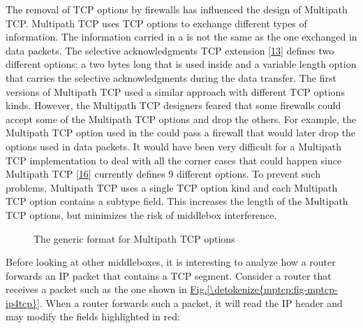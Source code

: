 \documentclass[letterpaper,10pt,english]{sphinxmanual}
\begin{document}
\sphinxAtStartPar
The removal of TCP options by firewalls has influenced the design of Multipath TCP. Multipath TCP uses TCP options to exchange different types of information. The information carried in a  is not the same as the one exchanged in data packets. The selective acknowledgments TCP extension {[}\hyperlink{cite.biblio:id1948}{13}{]} defines two different options: a two bytes long  that is used inside  and a variable length  option that carries the selective acknowledgments during the data transfer. The first versions of Multipath TCP used a similar approach with different TCP options kinds. However, the Multipath TCP designers feared that some firewalls could accept some of the Multipath TCP options and drop the others. For example, the Multipath TCP option used in the  could pass a firewall that would later drop the options used in data packets. It would have been very difficult for a Multipath TCP implementation to deal with all the corner cases that could happen since Multipath TCP {[}\hyperlink{cite.biblio:id8500}{16}{]} currently defines 9 different options. To prevent such problems, Multipath TCP uses a single TCP option kind and each Multipath TCP option contains a subtype field. This increases the length of the Multipath TCP options, but minimizes the risk of middlebox interference.
\begin{figure}[htbp]\centering\capstart{}\caption{The generic format for Multipath TCP options}\label{\detokenize{mptcp:id77}}\label{\detokenize{mptcp:fig-mptcp-tcp-option2}}\end{figure}
\sphinxAtStartPar
Before looking at other middleboxes, it is interesting to analyze how a router forwards an IP packet that contains a TCP segment. Consider a router that receives a packet such as the one shown in \hyperref[\detokenize{mptcp:fig-mptcp-ip4tcp}]{Fig.\@ \ref{\detokenize{mptcp:fig-mptcp-ip4tcp}}}. When a router forwards such a packet, it will read the IP header and may modify the fields highlighted in red:
\end{document}
